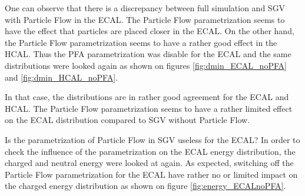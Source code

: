One can observe that there is a discrepancy between full simulation and SGV with Particle Flow in the ECAL. The Particle Flow parametrization seems to have the effect that particles are placed closer in the ECAL. On the other hand, the Particle Flow parametrization seems to have a rather good effect in the HCAL. Thus the PFA parametrization was disable for the ECAL and the same distributions were looked again as shown on figures \ref{fig:dmin_ECAL_noPFA} and \ref{fig:dmin_HCAL_noPFA}.



In that case, the distributions are in rather good agreement for the ECAL and HCAL. The Particle Flow parametrization seems to have a rather limited effect on the ECAL distribution compared to SGV without Particle Flow.

Is the parametrization of Particle Flow in SGV useless for the ECAL? In order to check the influence of the parametrization on the ECAL energy distribution, the charged and neutral energy were looked at again. As expected, switching off the Particle Flow parametrization for the ECAL have rather no or limited impact on the charged energy distribution as shown on figure \ref{fig:energy_ECALnoPFA}.

